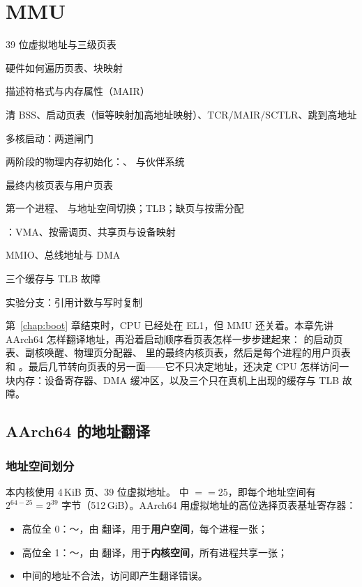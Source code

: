 \chapter{MMU}
\label{chap:mmu}

\begin{introduction}[本章内容]
  \item 39 位虚拟地址与三级页表
  \item 硬件如何遍历页表、块映射
  \item 描述符格式与内存属性（MAIR）
  \item 清 BSS、启动页表（恒等映射加高地址映射）、TCR/MAIR/SCTLR、跳到高地址
  \item 多核启动：两道闸门
  \item 两阶段的物理内存初始化：、 与伙伴系统
  \item 最终内核页表与用户页表
  \item 第一个进程、 与地址空间切换；TLB；缺页与按需分配
  \item {}：VMA、按需调页、共享页与设备映射
  \item MMIO、总线地址与 DMA
  \item 三个缓存与 TLB 故障
  \item 实验分支：引用计数与写时复制
\end{introduction}

第~\ref{chap:boot} 章结束时，CPU 已经处在 EL1，但 MMU 还关着。本章先讲 AArch64 怎样翻译地址，再沿着启动顺序看页表怎样一步步建起来： 的启动页表、副核唤醒、物理页分配器、 里的最终内核页表，然后是每个进程的用户页表和 。最后几节转向页表的另一面——它不只决定地址，还决定 CPU 怎样访问一块内存：设备寄存器、DMA 缓冲区，以及三个只在真机上出现的缓存与 TLB 故障。

\section{AArch64 的地址翻译}

\subsection{地址空间划分}

本内核使用 4\,KiB 页、39 位虚拟地址。 中 $=$$=25$，即每个地址空间有 $2^{64-25}=2^{39}$ 字节（512\,GiB）。AArch64 用虚拟地址的高位选择页表基址寄存器：

\begin{itemize}
  \item 高位全 0：～，由  翻译，用于\textbf{用户空间}，每个进程一张；
  \item 高位全 1：～，由  翻译，用于\textbf{内核空间}，所有进程共享一张；
  \item 中间的地址不合法，访问即产生翻译错误。
\end{itemize}


